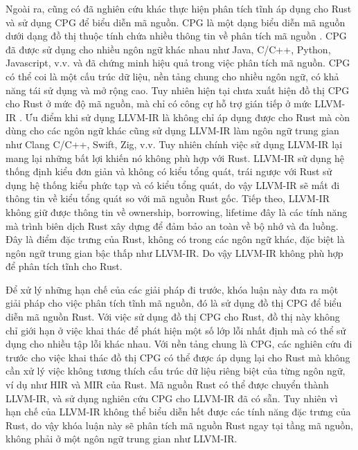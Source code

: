 Ngoài ra, cũng có đã nghiên cứu khác thực hiện phân tích tĩnh áp dụng cho Rust và sử dụng CPG để biểu diễn mã nguồn.
CPG là một dạng biểu diễn mã nguồn dưới dạng đồ thị thuộc tính chứa nhiều thông tin về phân tích mã nguồn \cite{yamaguchi2014modeling}.
CPG đã được sử dụng cho nhiều ngôn ngữ khác nhau như Java, C/C++, Python, Javascript, v.v. và đã chứng minh hiệu quả trong việc phân tích mã nguồn.
CPG có thể coi là một cấu trúc dữ liệu, nền tảng chung cho nhiều ngôn ngữ, có khả năng tái sử dụng và mở rộng cao.
Tuy nhiên hiện tại chưa xuất hiện đồ thị CPG cho Rust ở mức độ mã nguồn, mà chỉ có công cự hỗ trợ gián tiếp ở mức LLVM-IR \cite{kuchler2022representing}.
Ưu điểm khi sử dụng LLVM-IR \cite{lattner2004llvm} là không chỉ áp dụng được cho Rust mà còn dùng cho các ngôn ngữ khác cũng sử dụng LLVM-IR làm ngôn ngữ trung gian như Clang C/C++, Swift, Zig, v.v.
Tuy nhiên chính việc sử dụng LLVM-IR lại mang lại những bất lợi khiến nó không phù hợp với Rust.
LLVM-IR sử dụng hệ thống định kiểu đơn giản và không có kiểu tổng quát, trái ngược với Rust sử dụng hệ thống kiểu phức tạp và có kiểu tổng quát, do vậy LLVM-IR sẽ mất đi thông tin về kiểu tổng quát so với mã nguồn Rust gốc.
Tiếp theo, LLVM-IR không giữ được thông tin về ownership, borrowing, lifetime đây là các tính năng mà trình biên dịch Rust xây dựng để đảm bảo an toàn về bộ nhớ và đa luồng.
Đây là điểm đặc trưng của Rust, không có trong các ngôn ngữ khác, đặc biệt là ngôn ngữ trung gian bậc thấp như LLVM-IR.
Do vậy LLVM-IR không phù hợp để phân tích tĩnh cho Rust.


Để xử lý những hạn chế của các giải pháp đi trước, khóa luận này đưa ra một giải pháp cho việc phân tích tĩnh mã nguồn, đó là sử dụng đồ thị CPG để biểu diễn mã nguồn Rust.
Với việc sử dụng đồ thị CPG cho Rust, đồ thị này không chỉ giới hạn ở việc khai thác để phát hiện một số lớp lỗi nhất định mà có thể sử dụng cho nhiều tập lỗi khác nhau.
Với nền tảng chung là CPG, các nghiên cứu đi trước cho việc khai thác đồ thị CPG có thể được áp dụng lại cho Rust mà không cần xử lý việc không tương thích cấu trúc dữ liệu riêng biệt của từng ngôn ngữ, ví dụ như HIR và MIR của Rust.
Mã nguồn Rust có thể được chuyển thành LLVM-IR, và sử dụng nghiên cứu CPG cho LLVM-IR đã có sẵn.
Tuy nhiên vì hạn chế của LLVM-IR không thể biểu diễn hết được các tính năng đặc trưng của Rust, do vậy khóa luận này sẽ phân tích mã nguồn Rust ngay tại tầng mã nguồn, không phải ở một ngôn ngữ trung gian như LLVM-IR.

